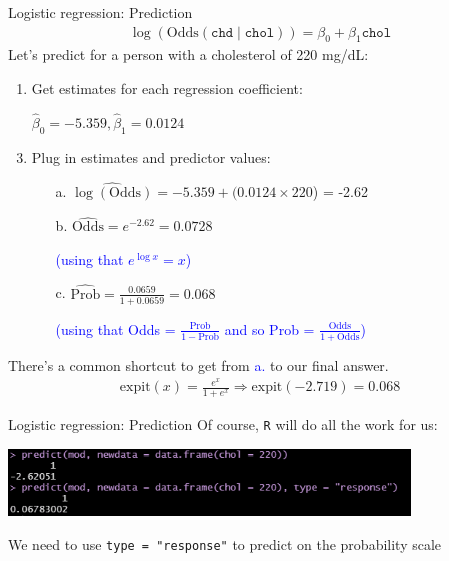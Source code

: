 \documentclass[10pt,t]{beamer}
\begin{document}
\begin{frame}{Logistic regression: Prediction}
	\vspace{-1cm}
		\begin{align*}
		\log(\text{Odds}(\texttt{chd} \mid \texttt{chol})) = \beta_0 + \beta_1 \texttt{chol}
	\end{align*}
	Let's predict for a person with a cholesterol of 220 mg/dL:
	\begin{enumerate}
		\item Get estimates for each regression coefficient: 
		\item[] $\hat{\beta}_0 = -5.359, \hat{\beta}_1 = 0.0124$
		\item Plug in estimates and predictor values:
		\begin{enumerate}
			\item[a.] $\widehat{\log(\text{Odds})} = -5.359 + (0.0124\times220$) = -2.62
			\item[b.] $\widehat{\text{Odds}} = e^{-2.62} = 0.0728$
			\item[] \textcolor{blue}{(using that $e^{\log x} = x$)}
			\item[c.] $\widehat{\text{Prob}} = \frac{0.0659}{1 + 0.0659} = 0.068$
			\item[] \textcolor{blue}{(using that Odds = $\frac{\text{Prob}}{1-\text{Prob}}$ and so Prob = $\frac{\text{Odds}}{1  +\text{Odds}}$)}
		\end{enumerate}
	\end{enumerate}
	There's a common shortcut to get from \textcolor{blue}{a.} to our final answer. 
	\begin{align*}
		\text{expit}(x) = \frac{e^x}{1 + e^x} \Rightarrow \text{expit}(-2.719) = 0.068
	\end{align*}
\end{frame}

\begin{frame}{Logistic regression: Prediction}
	Of course, \texttt{R} will do all the work for us: 
	\begin{center}
		\includegraphics[width=0.8\textwidth]{./figs/simple_logistic_regression_chol_prediction}
	\end{center}
	We need to use \texttt{type = "response"} to predict on the probability scale
\end{frame}
\end{document}
